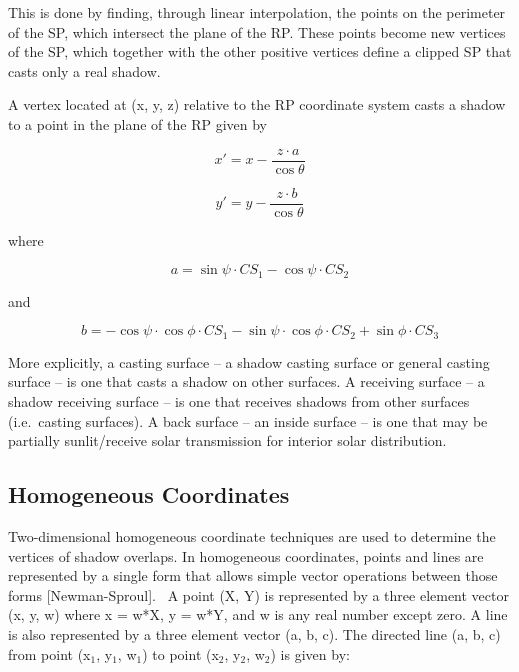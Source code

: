 This is done by finding, through linear interpolation, the points on the perimeter of the SP, which intersect the plane of the RP. These points become new vertices of the SP, which together with the other positive vertices define a clipped SP that casts only a real shadow.

A vertex located at (x, y, z) relative to the RP coordinate system casts a shadow to a point in the plane of the RP given by

\begin{equation}
{x'} = x - \frac{{z\cdot a}}{{\cos \theta }}
\end{equation}

\begin{equation}
{y'} = y - \frac{{z\cdot b}}{{\cos \theta }}
\end{equation}

where

\begin{equation}
a = \sin \psi \cdot C{S_1} - \cos \psi \cdot C{S_2}
\end{equation}

and

\begin{equation}
b =  - \cos \psi \cdot \cos \phi \cdot C{S_1} - \sin \psi \cdot \cos \phi \cdot C{S_2} + \sin \phi \cdot C{S_3}
\end{equation}

More explicitly, a casting surface -- a shadow casting surface or general casting surface -- is one that casts a shadow on other surfaces. A receiving surface -- a shadow receiving surface -- is one that receives shadows from other surfaces (i.e.~casting surfaces). A back surface -- an inside surface -- is one that may be partially sunlit/receive solar transmission for interior solar distribution.

\subsection{Homogeneous Coordinates}\label{homogeneous-coordinates}

Two-dimensional homogeneous coordinate techniques are used to determine the vertices of shadow overlaps. In homogeneous coordinates, points and lines are represented by a single form that allows simple vector operations between those forms {[}Newman-Sproul{]}.~ A point (X, Y) is represented by a three element vector (x, y, w) where x = w*X, y = w*Y, and w is any real number except zero. A line is also represented by a three element vector (a, b, c). The directed line (a, b, c) from point (x\(_{1}\), y\(_{1}\), w\(_{1}\)) to point (x\(_{2}\), y\(_{2}\), w\(_{2}\)) is given by:

